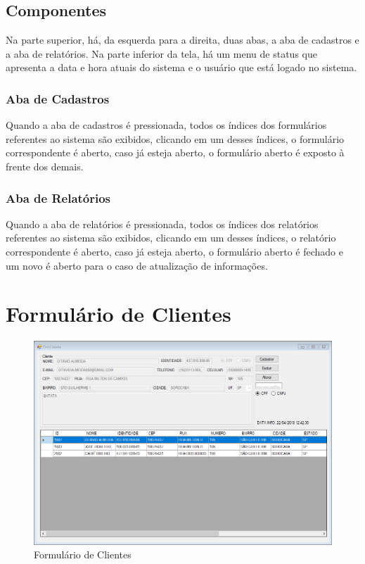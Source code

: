\documentclass[
	article,			%
	12pt,				%
	oneside,			%
	a4paper,			%
	english,			%
	brazil,				%
	sumario=tradicional
	]{abntex2}
\begin{document}
	\subsection{Componentes}
	Na parte superior, há, da esquerda para a direita, duas abas, a aba de cadastros e a aba de relatórios.
	Na parte inferior da tela, há um menu de status que apresenta a data e hora atuais do sistema e o usuário que está logado no sistema.
	\subsubsection{Aba de Cadastros}
	Quando a aba de cadastros é pressionada, todos os índices dos formulários referentes ao sistema são exibidos, clicando em um desses índices, o formulário correspondente é aberto, caso já esteja aberto, o formulário aberto é exposto à frente dos demais.
	\subsubsection{Aba de Relatórios}
	Quando a aba de relatórios é pressionada, todos os índices dos relatórios referentes ao sistema são exibidos, clicando em um desses índices, o relatório correspondente é aberto, caso já esteja aberto, o formulário aberto é fechado e um novo é aberto para o caso de atualização de informações.
	\newpage
	\section{Formulário de Clientes}
	\begin{figure}[!htb]
		\centering
		\includegraphics[scale=0.6]{../Figuras/FrmCliente.png}
		\caption{Formulário de Clientes}
	\end{figure}	
\end{document}
